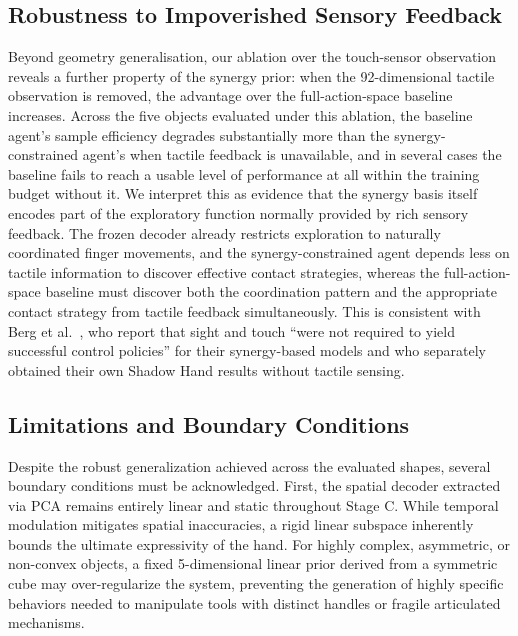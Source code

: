 \documentclass[letterpaper, 10 pt, conference]{ieeeconf}  %
\begin{document}
\subsection{Robustness to Impoverished Sensory Feedback}
Beyond geometry generalisation, our ablation over the touch-sensor observation reveals a further property of the synergy prior: when the 92-dimensional tactile observation is removed, the advantage over the full-action-space baseline increases. Across the five objects evaluated under this ablation, the baseline agent's sample efficiency degrades substantially more than the synergy-constrained agent's when tactile feedback is unavailable, and in several cases the baseline fails to reach a usable level of performance at all within the training budget without it. We interpret this as evidence that the synergy basis itself encodes part of the exploratory function normally provided by rich sensory feedback. The frozen decoder already restricts exploration to naturally coordinated finger movements, and the synergy-constrained agent depends less on tactile information to discover effective contact strategies, whereas the full-action-space baseline must discover both the coordination pattern and the appropriate contact strategy from tactile feedback simultaneously.
This is consistent with Berg et al.~\cite{c9}, who report that sight and touch ``were not required to yield successful control policies'' for their synergy-based models and who separately obtained their own Shadow Hand results without tactile sensing.


\subsection{Limitations and Boundary Conditions}
Despite the robust generalization achieved across the evaluated shapes, several boundary conditions must be acknowledged. First, the spatial decoder extracted via PCA remains entirely linear and static throughout Stage C. While temporal modulation mitigates spatial inaccuracies, a rigid linear subspace inherently bounds the ultimate expressivity of the hand. For highly complex, asymmetric, or non-convex objects, a fixed 5-dimensional linear prior derived from a symmetric cube may over-regularize the system, preventing the generation of highly specific behaviors needed to manipulate tools with distinct handles or fragile articulated mechanisms. 
\end{document}
